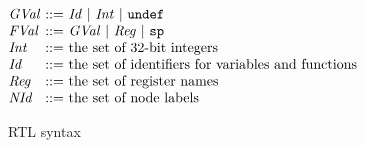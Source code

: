 \begin{figure}[t]
\[
\begin{array}{@{}l@{~}c@{~}l@{~~}lr@{}}
\rtlGVal&::=&\multicolumn{2}{@{}l@{}}{\rtlId ~|~ \rtlInt ~|~ \rtlundef}\\
\rtlFVal&::=&\multicolumn{2}{@{}l@{}}{\rtlGVal ~|~ \rtlReg ~|~ \rtlsp}\\
\rtlInt&::=&\multicolumn{2}{@{}l@{}}{\text{the set of 32-bit integers}}\\
\rtlId&::=&\multicolumn{2}{@{}l@{}}{\text{the set of identifiers for variables and functions \qquad\qquad\qquad}}\\
\rtlReg&::=&\multicolumn{2}{@{}l@{}}{\text{the set of register names}}\\
\rtlNId&::=&\multicolumn{2}{@{}l@{}}{\text{the set of node labels}}\\
\end{array}
\]
\caption{RTL syntax}
\label{fig:rtl-syntax}
\end{figure}


